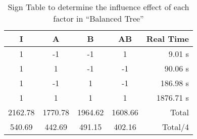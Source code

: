 \begin{table}[h]
	\caption{Sign Table to determine the influence effect of each factor in ``Balanced Tree''}
	\center
	\begin{tabular}{ c c c c r }
		\hline
		I & A & B & AB & Real Time \\
		\hline
		1 & -1 & -1 &  1 &    9.01 s \\
		1 &  1 & -1 & -1 &   90.06 s \\
		1 & -1 &  1 & -1 &  186.98 s \\
		1 &  1 &  1 &  1 & 1876.71 s \\
		\hline
		2162.78 & 1770.78 & 1964.62 & 1608.66 & Total \\
		540.69 & 442.69 & 491.15 & 402.16 & Total/4 \\
		\hline
	\end{tabular}
\end{table}